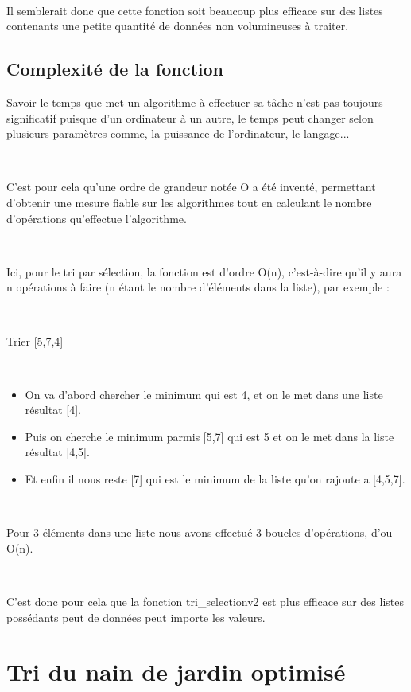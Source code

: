 \documentclass[a4paper, 12pt]{article}
\begin{document}
~

Il semblerait donc que cette fonction soit beaucoup plus efficace sur des listes contenants une petite quantité de données non volumineuses à traiter.


\subsection{Complexité de la fonction}

Savoir le temps que met un algorithme à effectuer sa tâche n'est pas toujours significatif puisque d'un ordinateur à un autre, le temps peut changer selon plusieurs paramètres comme, la puissance de l'ordinateur, le langage... 

~

C'est pour cela qu'une ordre de grandeur notée O a été inventé, permettant d'obtenir une mesure fiable sur les algorithmes tout en calculant le nombre d'opérations qu'effectue l'algorithme. 

~

Ici, pour le tri par sélection, la fonction est d'ordre O(n), c'est-à-dire qu'il y aura n opérations à faire (n étant le nombre d'éléments dans la liste), par exemple : 

~

Trier [5,7,4]

~

\begin{itemize}
\item On va d'abord chercher le minimum qui est 4, et on le met dans une liste résultat [4].
\item Puis on cherche le minimum parmis [5,7] qui est 5 et on le met dans la liste résultat [4,5].
\item Et enfin il nous reste [7] qui est le minimum de la liste qu'on rajoute a [4,5,7].
\end{itemize}

~

Pour 3 éléments dans une liste nous avons effectué 3 boucles d'opérations, d'ou O(n).

~

C'est donc pour cela que la fonction tri\_selectionv2 est plus efficace sur des listes possédants peut de données peut importe les valeurs. 


\section{Tri du nain de jardin optimisé}
\end{document}
